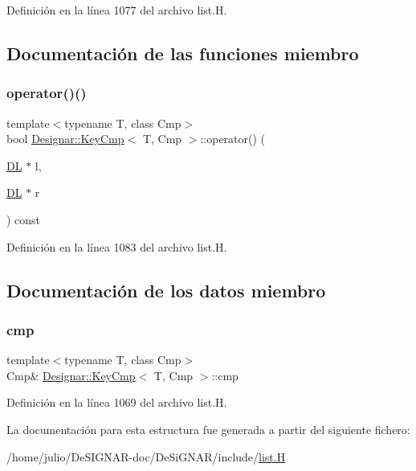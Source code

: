 Definición en la línea 1077 del archivo list.\+H.



\subsection{Documentación de las funciones miembro}
\mbox{\label{struct_designar_1_1_key_cmp_aa48c4fb700b4ba3bd243c3426288455e}} 
\subsubsection{\texorpdfstring{operator()()}{operator()()}}
{\footnotesize\ttfamily template$<$typename T, class Cmp$>$ \\
bool \hyperlink{struct_designar_1_1_key_cmp}{Designar\+::\+Key\+Cmp}$<$ T, Cmp $>$\+::operator() (\begin{DoxyParamCaption}\item[{\hyperlink{class_designar_1_1_d_l}{DL} $\ast$}]{l,  }\item[{\hyperlink{class_designar_1_1_d_l}{DL} $\ast$}]{r }\end{DoxyParamCaption}) const\hspace{0.3cm}{\ttfamily [inline]}}



Definición en la línea 1083 del archivo list.\+H.



\subsection{Documentación de los datos miembro}
\mbox{\label{struct_designar_1_1_key_cmp_a459613d03deb91c821f26cfafdd93dab}} 
\subsubsection{\texorpdfstring{cmp}{cmp}}
{\footnotesize\ttfamily template$<$typename T, class Cmp$>$ \\
Cmp\& \hyperlink{struct_designar_1_1_key_cmp}{Designar\+::\+Key\+Cmp}$<$ T, Cmp $>$\+::cmp}



Definición en la línea 1069 del archivo list.\+H.



La documentación para esta estructura fue generada a partir del siguiente fichero\+:\begin{DoxyCompactItemize}
\item 
/home/julio/\+De\+S\+I\+G\+N\+A\+R-\/doc/\+De\+Si\+G\+N\+A\+R/include/\hyperlink{list_8_h}{list.\+H}\end{DoxyCompactItemize}
